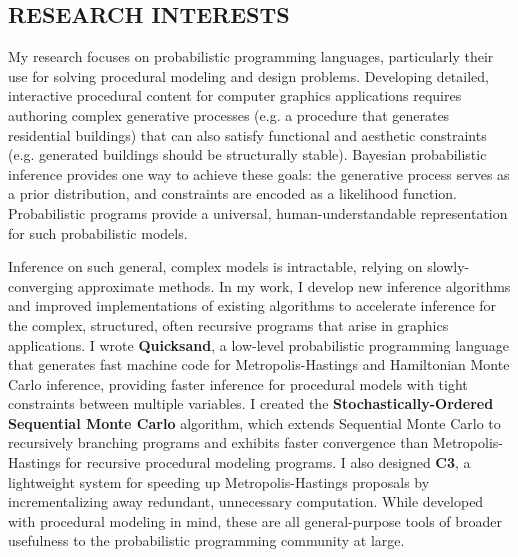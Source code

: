 \documentclass[line,margin]{res}
\begin{document}
\address{\url{dritchie@stanford.edu} | \url{stanford.edu/~dritchie}}
\address{353 Serra Mall \#381, Stanford, CA 94305}
 
\begin{resume}

\section{RESEARCH INTERESTS}
My research focuses on probabilistic programming languages, particularly their use for solving procedural modeling and design problems. Developing detailed, interactive procedural content for computer graphics applications requires authoring complex generative processes (e.g. a procedure that generates residential buildings) that can also satisfy functional and aesthetic constraints (e.g. generated buildings should be structurally stable). Bayesian probabilistic inference provides one way to achieve these goals: the generative process serves as a prior distribution, and constraints are encoded as a likelihood function. Probabilistic programs provide a universal, human-understandable representation for such probabilistic models. 

Inference on such general, complex models is intractable, relying on slowly-converging approximate methods. In my work, I develop new inference algorithms and improved implementations of existing algorithms to accelerate inference for the complex, structured, often recursive programs that arise in graphics applications. I wrote \textbf{Quicksand}, a low-level probabilistic programming language that generates fast machine code for Metropolis-Hastings and Hamiltonian Monte Carlo inference, providing faster inference for procedural models with tight constraints between multiple variables. I created the \textbf{Stochastically-Ordered Sequential Monte Carlo} algorithm, which extends Sequential Monte Carlo to recursively branching programs and exhibits faster convergence than Metropolis-Hastings for recursive procedural modeling programs. I also designed \textbf{C3}, a lightweight system for speeding up Metropolis-Hastings proposals by incrementalizing away redundant, unnecessary computation. While developed with procedural modeling in mind, these are all general-purpose tools of broader usefulness to the probabilistic programming community at large.
 

\end{resume}
\end{document}
